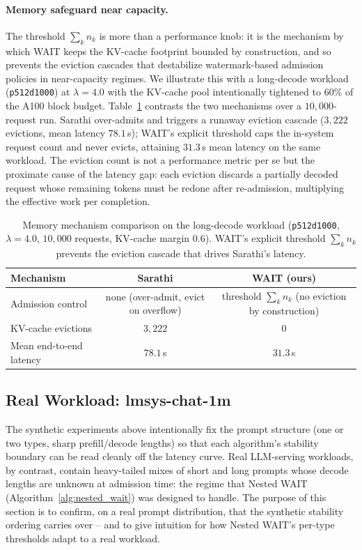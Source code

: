 \paragraph{Memory safeguard near capacity.}
The threshold $\sum_k n_k$ is more than a performance knob: it is the mechanism by which WAIT keeps the KV-cache footprint bounded by construction, and so prevents the eviction cascades that destabilize watermark-based admission policies in near-capacity regimes. We illustrate this with a long-decode workload (\texttt{p512d1000}) at $\lambda = 4.0$ with the KV-cache pool intentionally tightened to $60\%$ of the A100 block budget. Table~\ref{tab:eviction} contrasts the two mechanisms over a $10{,}000$-request run. Sarathi over-admits and triggers a runaway eviction cascade ($3{,}222$ evictions, mean latency $78.1$\,s); WAIT's explicit threshold caps the in-system request count and never evicts, attaining $31.3$\,s mean latency on the same workload. The eviction count is not a performance metric per se but the proximate cause of the latency gap: each eviction discards a partially decoded request whose remaining tokens must be redone after re-admission, multiplying the effective work per completion.

\begin{table}[h]
\centering
\small
\begin{tabular}{lcc}
\toprule
Mechanism & Sarathi & WAIT (ours) \\
\midrule
Admission control       & none (over-admit, evict on overflow) & threshold $\sum_k n_k$ (no eviction by construction) \\
KV-cache evictions      & $3{,}222$ & $0$ \\
Mean end-to-end latency & $78.1$\,s & $31.3$\,s \\
\bottomrule
\end{tabular}
\caption{Memory mechanism comparison on the long-decode workload (\texttt{p512d1000}, $\lambda = 4.0$, $10{,}000$ requests, KV-cache margin $0.6$). WAIT's explicit threshold $\sum_k n_k$ prevents the eviction cascade that drives Sarathi's latency.}
\label{tab:eviction}
\end{table}

\subsection{Real Workload: lmsys-chat-1m}
\label{sec:exp_real}

The synthetic experiments above intentionally fix the prompt structure (one or two types, sharp prefill/decode lengths) so that each algorithm's stability boundary can be read cleanly off the latency curve. Real LLM-serving workloads, by contrast, contain heavy-tailed mixes of short and long prompts whose decode lengths are unknown at admission time: the regime that Nested WAIT (Algorithm~\ref{alg:nested_wait}) was designed to handle. The purpose of this section is to confirm, on a real prompt distribution, that the synthetic stability ordering carries over -- and to give intuition for how Nested WAIT's per-type thresholds adapt to a real workload.

